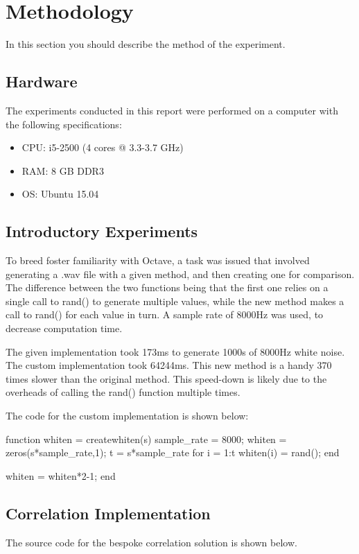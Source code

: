 \section{Methodology}
In this section you should describe the method of the experiment.



\subsection{Hardware}
The experiments conducted in this report were performed on a computer with the following specifications:
\begin{itemize}
	\item CPU: i5-2500 (4 cores @ 3.3-3.7	GHz)
	\item RAM: 8 GB DDR3
	\item OS:  Ubuntu 15.04
\end{itemize}

\subsection{Introductory Experiments}
To breed foster familiarity with Octave, a task was issued that involved generating a .wav file with a given method, and then creating one for comparison. The difference between the two functions being that the first one relies on a single call to rand() to generate multiple values, while the new method makes a call to rand() for each value in turn. A sample rate of 8000Hz was used, to decrease computation time. 

The given implementation took 173ms to generate 1000s of 8000Hz white noise. The custom implementation took 64244ms. This new method is a handy 370 times slower than the original method. This speed-down is likely due to the overheads of calling the rand() function multiple times.

The code for the custom implementation is shown below:

\begin{Matlab}
function whiten = createwhiten(s)
  sample_rate = 8000;
  whiten = zeros(s*sample_rate,1);
  t = s*sample_rate
  for i = 1:t
    whiten(i) = rand();
  end
  
  whiten = whiten*2-1;
end
\end{Matlab}


\subsection{Correlation Implementation}
The source code for the bespoke correlation solution is shown below.

